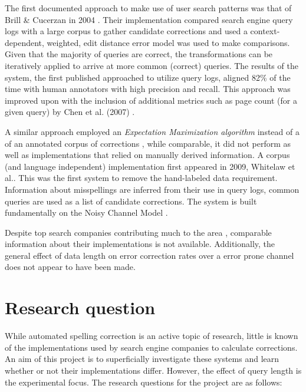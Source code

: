 \documentclass{csfourzero}
\begin{document}
The first documented approach to make use of user search patterns was that of Brill \& Cucerzan in 2004 \cite{webuserpoweredspelling}. Their implementation compared search engine query logs with a large corpus to gather candidate corrections and used a context-dependent, weighted, edit distance error model was used to make comparisons. Given that the majority of queries are correct, the transformations can be iteratively applied to arrive at more common (correct) queries. The results of the system, the first published approached to utilize query logs, aligned 82\% of the time with human annotators with high precision and recall. This approach was improved upon with the inclusion of additional metrics such as page count (for a given query) by Chen et al. (2007) \cite{webuser3}.

A similar approach employed an \textit{Expectation Maximization algorithm} instead of a of an annotated corpus of corrections \cite{webuser2learningerrormodel}, while comparable, it did not perform as well as implementations that relied on manually derived information. A corpus (and language independent) implementation first appeared in 2009, Whitelaw et al.\cite{webuser4google2009}. This was the first system to remove the hand-labeled data requirement. Information about misspellings are inferred from their use in query logs, common queries are used as a list of candidate corrections. The system is built fundamentally on the Noisy Channel Model \cite{claudeshannon1948}.

Despite top search companies contributing much to the area \cite{microranker, webuser3, webuserpoweredspelling, microranker, microphone, webuser4google2009}, comparable information about their implementations is not available. Additionally, the general effect of data length on error correction rates over a error prone channel does not appear to have been made.

\section{Research question}
\label{sec:rq}

While automated spelling correction is an active topic of research, little is known of the implementations used by search engine companies to calculate corrections. An aim of this project is to superficially investigate these systems and learn whether or not their implementations differ. However, the effect of query length is the experimental focus. The research questions for the project are as follows:
\end{document}
